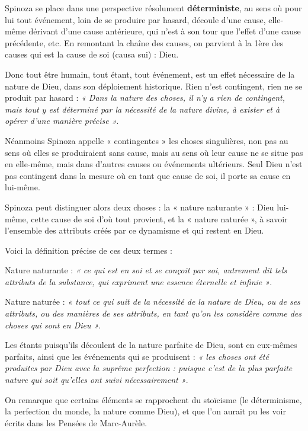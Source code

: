 \vspace{0.5cm}
Spinoza se place dans une perspective résolument {\bf déterministe}, au sens où pour
lui tout événement, loin de se produire par hasard, découle d’une cause,
elle-même dérivant d’une cause antérieure, qui n’est à son tour que l’effet
d’une cause précédente, etc. En remontant la chaîne des causes, on parvient à
la 1ère des causes qui est la cause de soi (causa sui) : Dieu.

Donc tout être humain, tout étant, tout événement, est un effet nécessaire de
la nature de Dieu, dans son déploiement historique. Rien n’est contingent, rien
ne se produit par hasard : {\it « Dans la nature des choses, il n’y a rien de
contingent, mais tout y est déterminé par la nécessité de la nature divine,
à exister et à opérer d’une manière précise »}.

Néanmoins Spinoza appelle « contingentes » les choses singulières, non pas au
sens où elles se produiraient sans cause, mais au sens où leur cause ne se
situe pas en elle-même, mais dans d’autres causes ou événements ultérieurs.
Seul Dieu n’est pas contingent dans la mesure où en tant que cause de soi,
il porte sa cause en lui-même.

\vspace{0.5cm}
Spinoza peut distinguer alors deux choses : la « nature naturante » : Dieu
lui-même, cette cause de soi d’où tout provient, et la « nature naturée »,
à savoir l’ensemble des attributs créés par ce dynamisme et qui restent en Dieu.

Voici la définition précise de ces deux termes :

Nature naturante : {\it « ce qui est en soi et se conçoit par soi, autrement dit
tels attributs de la substance, qui expriment une essence éternelle et infinie »}.

Nature naturée : {\it « tout ce qui suit de la nécessité de la nature de Dieu, ou
de ses attributs, ou des manières de ses attributs, en tant qu’on les considère
comme des choses qui sont en Dieu »}.

\vspace{0.5cm}
Les étants puisqu’ils découlent de la nature parfaite de Dieu, sont en
eux-mêmes parfaits, ainsi que les événements qui se produisent : {\it « les choses
ont été produites par Dieu avec la suprême perfection : puisque c’est de la
plus parfaite nature qui soit qu’elles ont suivi nécessairement »}.

\vspace{0.5cm}
On remarque que certains éléments se rapprochent du stoïcisme (le déterminisme,
la perfection du monde, la nature comme Dieu), et que l’on aurait pu les voir
écrits dans les Pensées de Marc-Aurèle.

